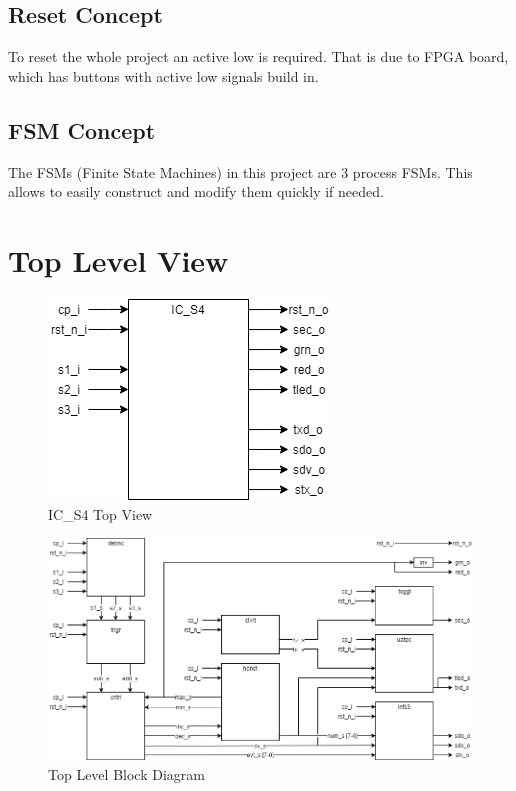 \documentclass[12pt,a4 paper] {report}
\begin{document}
\section*{Reset Concept}
To reset the whole project an active low is required. That is due to FPGA board, which has buttons with active low signals build in.
\section*{FSM Concept}
The FSMs (Finite State Machines) in this project are 3 process FSMs. This allows to easily construct and modify them quickly if needed.

\newpage

\chapter{Top Level View}
\begin{figure}[h]
	\centering
	\includegraphics[scale=0.6]{../png/top.png}
	\caption{IC\_S4 Top View}
\end{figure}
\begin{figure}[h]
	\centering
	\includegraphics[scale=0.4]{../png/top-level.png}
	\caption{Top Level Block Diagram}
\end{figure}
\end{document}
